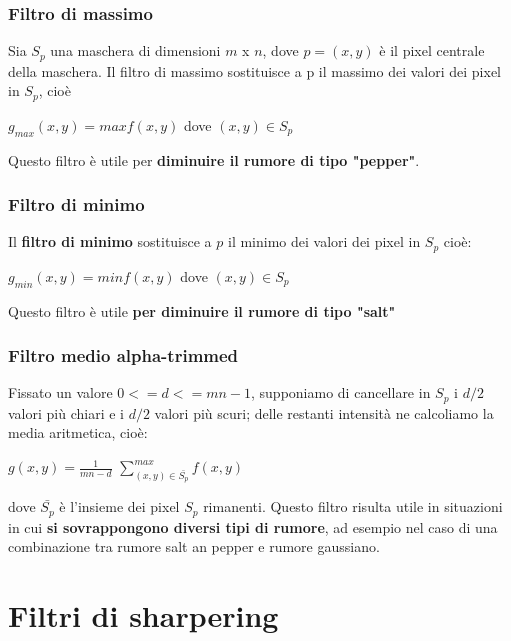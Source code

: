 \subsubsection{Filtro di massimo}

Sia $S_p$ una maschera di dimensioni $m $ x $n$, dove $p = (x,y)$ è il pixel centrale della maschera.
Il filtro di massimo sostituisce a p il massimo dei valori dei pixel in $S_p$, cioè

\begin{center}
    $g_{max}(x,y)=max f(x,y)$ dove $(x,y) \in S_p$
\end{center}

Questo filtro è utile per \textbf{diminuire il rumore di tipo "pepper"}.

\subsubsection{Filtro di minimo}

Il \textbf{filtro di minimo} sostituisce a $p$ il minimo dei valori dei pixel in $S_p$ cioè:

\begin{center}
    $g_{min}(x,y) = min f(x,y)$ dove $(x,y) \in S_p$
\end{center}

Questo filtro è utile \textbf{per diminuire il rumore di tipo "salt"}

\subsubsection{Filtro medio alpha-trimmed}

Fissato un valore $0 <= d <= mn − 1$, supponiamo di cancellare in $S_p$ i $d/2$ valori più chiari e i $d/2$ valori più scuri; delle
restanti intensità ne calcoliamo la media aritmetica, cioè:

\begin{center}
    $g(x,y) = \frac{1}{mn-d}$ $\sum_{(x,y) \in \bar{S_p}}^{max} f(x,y)$
\end{center}

dove $\bar{S_p}$ è l'insieme dei pixel $S_p$ rimanenti.
Questo filtro risulta utile in situazioni in cui \textbf{si sovrappongono diversi tipi di rumore}, ad esempio nel caso di una combinazione tra
rumore salt an pepper e rumore gaussiano.

\section{Filtri di sharpering}

